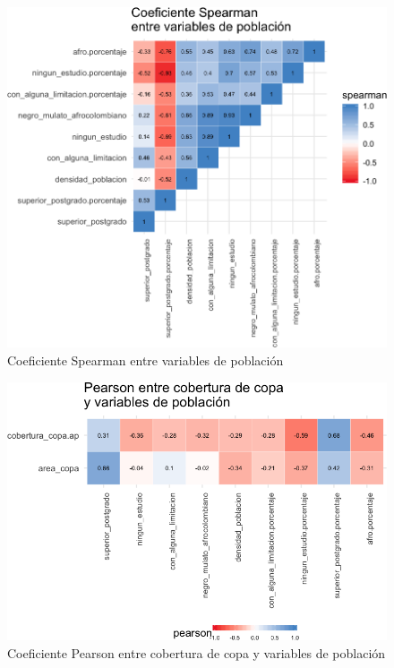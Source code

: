 \documentclass[12pt,a4paper,oneside, openany]{book}
\theoremstyle{definition}
\theoremstyle{definition}
\theoremstyle{definition}
\theoremstyle{remark}
\begin{document}
\begin{figure}[H]

{\centering \includegraphics[width=1\linewidth]{tesis-unigis_files/figure-latex/tile-poblacion-spearman-1} 

}

\caption{Coeficiente Spearman entre variables de población}\label{fig:tile-poblacion-spearman}
\end{figure}

\begin{figure}[H]

{\centering \includegraphics[width=1\linewidth]{tesis-unigis_files/figure-latex/tile-copa-poblacion-pearson-1} 

}

\caption{Coeficiente Pearson entre cobertura de copa y variables de población}\label{fig:tile-copa-poblacion-pearson}
\end{figure}
\end{document}
